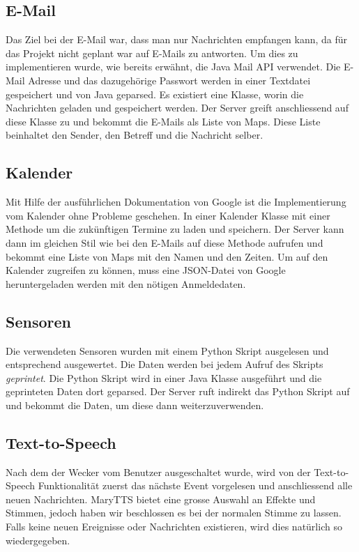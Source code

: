 \documentclass[11pt,a4paper]{article}
\begin{document}
\subsection{E-Mail}
Das Ziel bei der E-Mail war, dass man nur Nachrichten empfangen kann, da f\"ur das Projekt nicht geplant war auf E-Mails zu antworten. Um dies zu implementieren wurde, wie bereits erwähnt, die Java Mail API verwendet. Die E-Mail Adresse und das dazugehörige Passwort werden in einer Textdatei gespeichert und von Java geparsed. Es existiert eine Klasse, worin die Nachrichten geladen und gespeichert werden. Der Server greift anschliessend auf diese Klasse zu und bekommt die E-Mails als Liste von Maps. Diese Liste beinhaltet den Sender, den Betreff und die Nachricht selber.

\subsection{Kalender}
Mit Hilfe der ausführlichen Dokumentation von Google ist die Implementierung vom Kalender ohne Probleme geschehen. In einer Kalender Klasse mit einer Methode um die zukünftigen Termine zu laden und speichern. Der Server kann dann im gleichen Stil wie bei den E-Mails auf diese Methode aufrufen und bekommt eine Liste von Maps mit den Namen und den Zeiten. Um auf den Kalender zugreifen zu können, muss eine JSON-Datei von Google heruntergeladen werden mit den nötigen Anmeldedaten.

\subsection{Sensoren}
Die verwendeten Sensoren wurden mit einem Python Skript ausgelesen und entsprechend ausgewertet. Die Daten werden bei jedem Aufruf des Skripts \textit{geprintet}. Die Python Skript wird in einer Java Klasse ausgeführt und die geprinteten Daten dort geparsed. Der Server ruft indirekt das Python Skript auf und bekommt die Daten, um diese dann weiterzuverwenden.

\subsection{Text-to-Speech}
Nach dem der Wecker vom Benutzer ausgeschaltet wurde, wird von der Text-to-Speech Funktionalit\"at zuerst das n\"achste Event vorgelesen und anschliessend alle neuen Nachrichten. MaryTTS bietet eine grosse Auswahl an Effekte und Stimmen, jedoch haben wir beschlossen es bei der normalen Stimme zu lassen. Falls keine neuen Ereignisse oder Nachrichten existieren, wird dies natürlich so wiedergegeben.
\end{document}
